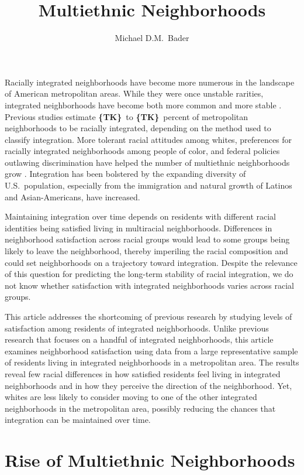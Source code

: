 \documentclass[11pt]{baderart}
\title{Multiethnic Neighborhoods}
\author{Michael D.M.~Bader}
\newcommand{\TK}{\textbf{\{TK\}}}
\begin{document}
\maketitle

\noindent Racially integrated neighborhoods have become more numerous in the landscape of American metropolitan areas. While they were once unstable rarities, integrated neighborhoods have become both more common and more stable \needcite. Previous studies estimate \TK\ to \TK\ percent of metropolitan neighborhoods to be racially integrated, depending on the method used to classify integration. More tolerant racial attitudes among whites, preferences for racially integrated neighborhoods among people of color, and federal policies outlawing discrimination have helped the number of multiethnic neighborhoods grow \needcite. Integration has been bolstered by the expanding diversity of U.S.\ population, especially from the immigration and natural growth of Latinos and Asian-Americans, have increased. 

Maintaining integration over time depends on residents with different racial identities being satisfied living in multiracial neighborhoods. Differences in neighborhood satisfaction across racial groups would lead to some groups being likely to leave the neighborhood, thereby imperiling the racial composition and could set neighborhoods on a trajectory toward integration. Despite the relevance of this question for predicting the long-term stability of racial integration, we do not know whether satisfaction with integrated neighborhoods varies across racial groups. 

This article addresses the shortcoming of previous research by studying levels of satisfaction among residents of integrated neighborhoods. Unlike previous research that focuses on a handful of integrated neighborhoods, this article examines neighborhood satisfaction using data from a large representative sample of residents living in integrated neighborhoods in a metropolitan area. The results reveal few racial differences in how satisfied residents feel living in integrated neighborhoods and in how they perceive the direction of the neighborhood. Yet, whites are less likely to consider moving to one of the other integrated neighborhoods in the metropolitan area, possibly reducing the chances that integration can be maintained over time. 

\section{Rise of Multiethnic Neighborhoods}
\end{document}
